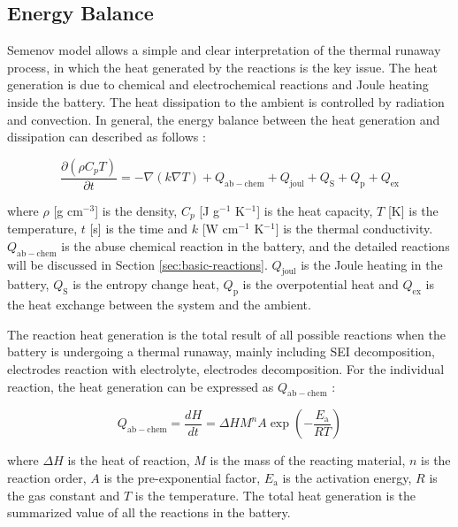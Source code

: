 \subsection{Energy Balance}
\label{sec:energy-balance}
Semenov model allows a simple and clear interpretation of the thermal runaway process, in which the heat generated by the reactions is the key issue. The heat generation is due to chemical and electrochemical reactions and Joule heating inside the battery. The heat dissipation to the ambient is controlled by radiation and convection. In general, the energy balance between the heat generation and dissipation can described as follows \cite{wang2012thermal,torabi2011study}:

\begin{equation}
    \label{eq:energy-balance}
    \frac{\partial\left(\rho C_p T\right)}{\partial t}=-\nabla(k \nabla T)+Q_{\mathrm{ab}-\text{chem}}+Q_{\text{joul}}+Q_{\mathrm{S}}+Q_{\mathrm{p}}+Q_{\mathrm{ex}}
\end{equation}

where $\rho$ [g cm$^{-3}$] is the density, $C_p$ [J g$^{-1}$ K$^{-1}$] is the  heat capacity, $T$ [K] is the temperature, $t$ [s] is the time and $k$ [W cm$^{-1}$ K$^{-1}$] is the thermal conductivity. $Q_{\mathrm{ab}-\text{chem}}$ is the abuse chemical reaction in the battery, and the detailed reactions will be discussed in Section \ref{sec:basic-reactions}. $Q_{\text{joul}}$ is the Joule heating in the battery, $Q_{\mathrm{S}}$ is the entropy change heat, $Q_{\mathrm{p}}$ is the overpotential heat and $Q_{\mathrm{ex}}$ is the heat exchange between the system and the ambient.

The reaction heat generation is the total result of all possible reactions when the battery is undergoing a thermal runaway, mainly including SEI decomposition, electrodes reaction with electrolyte, electrodes decomposition. For the individual reaction, the heat generation can be expressed as $Q_{\mathrm{ab}-\text{chem}}$ \cite{wang2010catastrophe}:

\begin{equation}
    \label{eq:heat-generation}
    Q_{\mathrm{ab}-\text{chem}}=\frac{d H}{d t}=\Delta H M^n A \exp \left(-\frac{E_{\mathrm{a}}}{R T}\right)
\end{equation}

where $\Delta H$ is the heat of reaction, $M$ is the mass of the reacting material, $n$ is the reaction order, $A$ is the pre-exponential factor, $E_{\mathrm{a}}$ is the activation energy, $R$ is the gas constant and $T$ is the temperature. The total heat generation is the summarized value of all the reactions in the battery.

